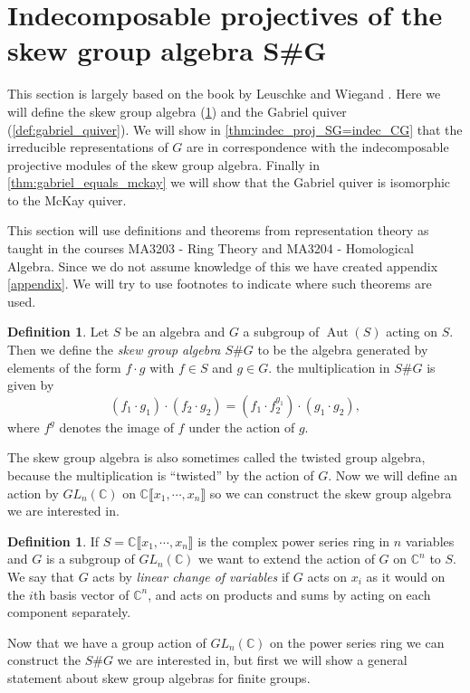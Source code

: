 \documentclass[11pt, a4paper, english]{article}
\theoremstyle{definition}
\newtheorem{defin}[theorem]{Definition}
\newcommand{\C}{\mathbb{C}}
\DeclareMathOperator{\Aut}{Aut}
\begin{document}
\clearpage
\section{Indecomposable projectives of the skew group algebra S\#G}
This section is largely based on the book by Leuschke and Wiegand \cite{LW12}. Here we will define the skew group algebra (\cref{def:skew_group_algebra}) and the Gabriel quiver (\cref{def:gabriel_quiver}). We will show in \cref{thm:indec_proj_SG=indec_CG} that the irreducible representations of $G$ are in correspondence with the indecomposable projective modules of the skew group algebra. Finally in \cref{thm:gabriel_equals_mckay} we will show that the Gabriel quiver is isomorphic to the McKay quiver.

This section will use definitions and theorems from representation theory as taught in the courses MA3203 - Ring Theory and MA3204 - Homological Algebra. Since we do not assume knowledge of this we have created appendix \ref{appendix}. We will try to use footnotes to indicate where such theorems are used.

\begin{defin}
\label{def:skew_group_algebra}
Let $S$ be an algebra and $G$ a subgroup of $\Aut(S)$ acting on $S$. Then we define the \textit{skew group algebra $S\#G$} to be the algebra generated by elements of the form $f \cdot g$ with $f \in S$ and $g \in G$. the multiplication in $S\#G$ is given by
$$ (f_1 \cdot g_1) \cdot (f_2 \cdot g_2) = (f_1 \cdot f_2^{g_1}) \cdot (g_1 \cdot g_2), $$
where $f^g$ denotes the image of $f$ under the action of $g$.
\end{defin}

The skew group algebra is also sometimes called the twisted group algebra, because the multiplication is ``twisted'' by the action of $G$. Now we will define an action by $GL_n(\C)$ on $\C \llbracket x_1, \cdots, x_n \rrbracket$ so we can construct the skew group algebra we are interested in.

\begin{defin}
If $S = \C \llbracket x_1, \cdots, x_n \rrbracket$ is the complex power series ring in $n$ variables and $G$ is a subgroup of $GL_n(\C)$ we want to extend the action of $G$ on $\C^n$ to $S$. We say that $G$ acts by \textit{linear change of variables} if $G$ acts on $x_i$ as it would on the $i$th basis vector of $\C^n$, and acts on products and sums by acting on each component separately. 
\end{defin}

Now that we have a group action of $GL_n(\C)$ on the power series ring we can construct the $S\#G$ we are interested in, but first we will show a general statement about skew group algebras for finite groups.
\end{document}
